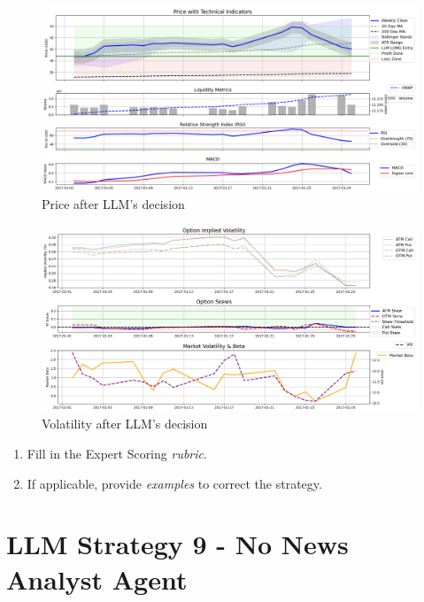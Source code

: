 \documentclass[8pt]{scrartcl}
\begin{document}
\begin{figure}[H]
    \centering
    \includegraphics[width=1\linewidth]{judge_reviews/GOOGL_M_gpt-4o-mini/2017-01-02/llm_Price_with_Technical_Indicators.png}
    \caption{Price after LLM's decision}
\end{figure}

\begin{figure}[H]
    \centering
    \includegraphics[width=1\linewidth]{judge_reviews/GOOGL_M_gpt-4o-mini/2017-01-02/llm_Market_Volatility_&_Beta.png}
    \caption{Volatility after LLM's decision}
\end{figure}

\begin{tcolorbox}[colback=blue!10, colframe=blue!60, title=\textbf{TASKS}, sharp corners=southwest]
\begin{enumerate}
    \item Fill in the Expert Scoring \textit{rubric}.
    \item If applicable, provide \textit{examples} to correct the strategy.
\end{enumerate}
\end{tcolorbox}
\newpage


\section*{LLM Strategy 9 - No News Analyst Agent}
\label{app:s9}
\end{document}
